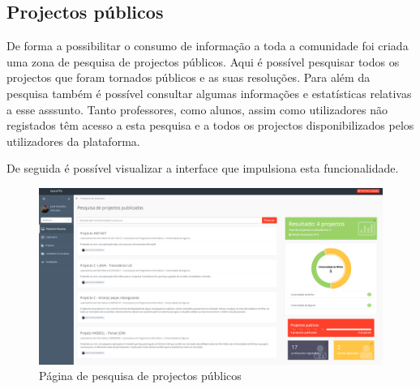 \subsection{Projectos públicos}

De forma a possibilitar o consumo de informação a toda a comunidade foi criada uma zona de pesquisa de projectos públicos. Aqui é possível pesquisar todos os projectos que foram tornados públicos e as suas resoluções. Para além da pesquisa também é possível consultar algumas informações e estatísticas relativas a esse asssunto.
Tanto professores, como alunos, assim como utilizadores não registados têm acesso a esta pesquisa e a todos os projectos disponibilizados pelos utilizadores da plataforma.

De seguida é possível visualizar a interface que impulsiona esta funcionalidade.

\begin{figure}[H]
  \centering
  \includegraphics[width=1\textwidth,center]{images/implementacao/publicos}
  \caption{Página de pesquisa de projectos públicos}
  \label{fig:public_projects}
\end{figure}
